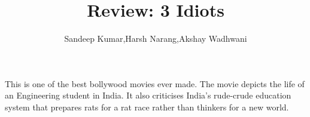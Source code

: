 \documentclass{article}
\title{Review: 3 Idiots}
\author{Sandeep Kumar,Harsh Narang,Akshay Wadhwani}
\begin{document}
\maketitle
This is one of the best bollywood movies ever made. The movie depicts the life of an Engineering student in India. It also criticises India's rude-crude education system that prepares rats for a rat race rather than thinkers for a new world.
\end{document}
